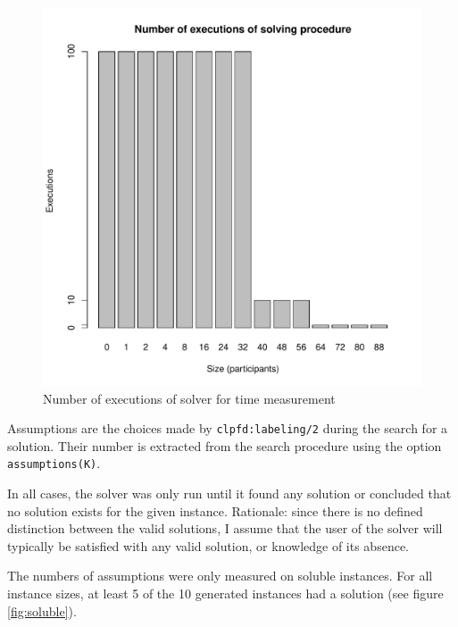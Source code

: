 \documentclass{article}
\newcommand{\code}[1]{\texttt{#1}}
\begin{document}
\begin{figure}
\centering
\includegraphics[width=\linewidth]{executions}
\caption{Number of executions of solver for time measurement}
\label{fig:executions}
\end{figure}

Assumptions are the choices made by \code{clpfd:labeling/2}
during the search for a solution.
Their number is extracted from the search procedure using the option
\code{assumptions(K)}.

In all cases, the solver was only run until it found any solution
or concluded that no solution exists for the given instance.
Rationale: since there is no defined distinction between the valid solutions,
I assume that the user of the solver will typically be satisfied
with any valid solution, or knowledge of its absence.

The numbers of assumptions were only measured on soluble instances.
For all instance sizes, at least 5 of the 10 generated instances had a solution
(see figure \ref{fig:soluble}).
\end{document}
